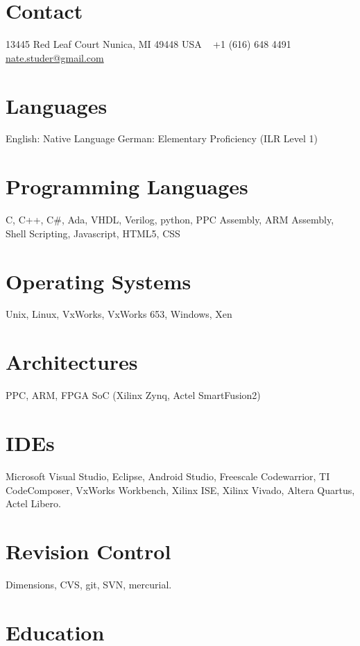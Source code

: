 \documentclass[print]{template/friggeri-cv} %
\begin{document}

\begin{aside} %
\section{Contact}
13445 Red Leaf Court
Nunica, MI 49448
USA
~
+1 (616) 648 4491
~
\href{mailto:nate.studer@gmail.com}{nate.studer@gmail.com}
\section{Languages}
English:  Native Language
German:  Elementary Proficiency (ILR Level 1)
\section{Programming Languages}
C, C++, C\#, Ada, VHDL, Verilog, python, PPC Assembly, ARM Assembly, Shell Scripting, Javascript, HTML5, CSS
\section{Operating Systems}
Unix, Linux, VxWorks, VxWorks 653, Windows, Xen
\section{Architectures}
PPC, ARM, FPGA SoC (Xilinx Zynq, Actel SmartFusion2)
\section{IDEs}
Microsoft Visual Studio, Eclipse, Android Studio, Freescale Codewarrior, TI CodeComposer, VxWorks Workbench, Xilinx ISE, Xilinx Vivado, Altera Quartus, Actel Libero.
\section{Revision Control}
Dimensions, CVS, git, SVN, mercurial.
\end{aside}

\section{Education}
\end{document}

